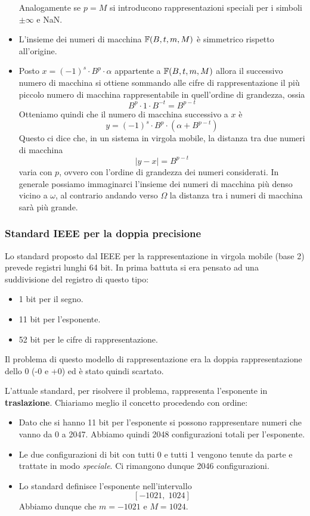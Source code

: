 \begin{observation}
\begin{itemize}
		      Analogamente se $p = M$ si introducono rappresentazioni speciali per i simboli $\pm \infty$
		      e NaN.
		\item L'insieme dei numeri di macchina $\mathbb{F} (B, t, m, M)$ è simmetrico rispetto all'origine.
		\item Posto $x = (-1)^s \cdot B^p \cdot \alpha$ appartente a $\mathbb{F}(B, t, m, M)$ allora il
		      successivo numero di macchina si ottiene sommando alle cifre di rappresentazione il più piccolo
		      numero di macchina rappresentabile in quell'ordine di grandezza, ossia
		      \[ B^p \cdot 1 \cdot B^{-t} = B^{p - t} \]
		      Otteniamo quindi che il numero di macchina successivo a $x$ è
		      \[ y = (-1)^s \cdot B^p \cdot (\alpha + B^{p-t}) \]
		      Questo ci dice che, in un sistema in virgola mobile, la distanza tra due numeri di macchina
		      \[ |y - x| = B^{p-t} \]
		      varia con $p$, ovvero con l'ordine di grandezza dei numeri considerati. In generale possiamo
		      immaginarci l'insieme dei numeri di macchina più denso vicino a $\omega$, al contrario andando verso
		      $\Omega$ la distanza tra i numeri di macchina sarà più grande.
	\end{itemize}
\end{observation}

\subsubsection{Standard IEEE per la doppia precisione}
Lo standard proposto dal IEEE per la rappresentazione in virgola mobile (base 2) prevede registri lunghi 64 bit.
In prima battuta si era pensato ad una suddivisione del registro di questo tipo:
\begin{itemize}
	\item 1 bit per il segno.
	\item 11 bit per l'esponente.
	\item 52 bit per le cifre di rappresentazione.
\end{itemize}
Il problema di questo modello di rappresentazione era la doppia rappresentazione dello 0 (-0 e +0) ed è stato
quindi scartato.

L'attuale standard, per risolvere il problema, rappresenta l'esponente in \textbf{traslazione}. Chiariamo meglio
il concetto procedendo con ordine:
\begin{itemize}
	\item Dato che si hanno 11 bit per l'esponente si possono rappresentare numeri che vanno da 0 a 2047. Abbiamo
	      quindi 2048 configurazioni totali per l'esponente.
	\item Le due configurazioni di bit con tutti 0 e tutti 1 vengono tenute da parte e trattate in modo
	      \emph{speciale}. Ci rimangono dunque 2046 configurazioni.
	\item Lo standard definisce l'esponente nell'intervallo
	      \[ [ -1021, \; 1024 ] \]
	      Abbiamo dunque che $m = -1021$ e $M = 1024$.
\end{itemize}
